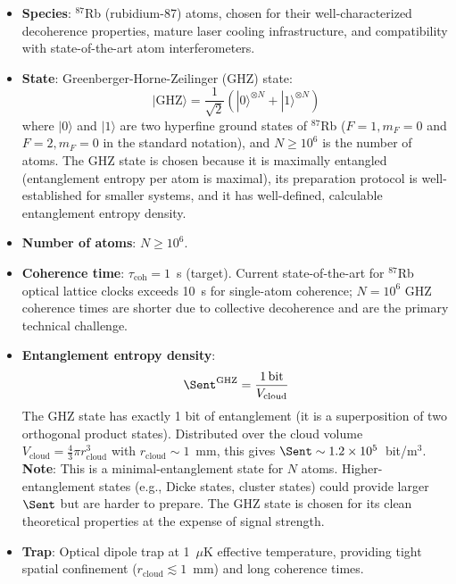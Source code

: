 \begin{itemize}
    \item \textbf{Species}: $^{87}$Rb (rubidium-87) atoms, chosen for
    their well-characterized decoherence properties, mature laser cooling
    infrastructure, and compatibility with state-of-the-art atom
    interferometers.

    \item \textbf{State}: Greenberger-Horne-Zeilinger (GHZ) state:
    \begin{equation}
        |\mathrm{GHZ}\rangle = \frac{1}{\sqrt{2}}\left(|0\rangle^{\otimes N}
        + |1\rangle^{\otimes N}\right)
        \label{eq:GHZ}
    \end{equation}
    where $|0\rangle$ and $|1\rangle$ are two hyperfine ground states of
    $^{87}$Rb ($F=1, m_F=0$ and $F=2, m_F=0$ in the standard notation),
    and $N \geq 10^6$ is the number of atoms. The GHZ state is chosen
    because it is maximally entangled (entanglement entropy per atom is
    maximal), its preparation protocol is well-established for smaller
    systems, and it has well-defined, calculable entanglement entropy
    density.

    \item \textbf{Number of atoms}: $N \geq 10^6$.

    \item \textbf{Coherence time}: $\tau_{\mathrm{coh}} = 1$~s (target).
    Current state-of-the-art for $^{87}$Rb optical lattice clocks exceeds
    10~s for single-atom coherence; $N = 10^6$ GHZ coherence times are
    shorter due to collective decoherence and are the primary technical
    challenge.

    \item \textbf{Entanglement entropy density}:
    \begin{equation}
        \Sent^{\mathrm{GHZ}} = \frac{1\,\mathrm{bit}}{V_{\mathrm{cloud}}}
        \label{eq:GHZ_entropy_density}
    \end{equation}
    The GHZ state has exactly 1 bit of entanglement (it is a superposition
    of two orthogonal product states). Distributed over the cloud volume
    $V_{\mathrm{cloud}} = \frac{4}{3}\pi r_{\mathrm{cloud}}^3$ with
    $r_{\mathrm{cloud}} \sim 1$~mm, this gives
    $\Sent \sim 1.2\times10^5$~bit/m$^3$.
    \textbf{Note}: This is a minimal-entanglement state for $N$ atoms.
    Higher-entanglement states (e.g., Dicke states, cluster states) could
    provide larger $\Sent$ but are harder to prepare. The GHZ state is
    chosen for its clean theoretical properties at the expense of signal
    strength.

    \item \textbf{Trap}: Optical dipole trap at 1~$\mu$K effective
    temperature, providing tight spatial confinement
    ($r_{\mathrm{cloud}} \lesssim 1$~mm) and long coherence times.
\end{itemize}

